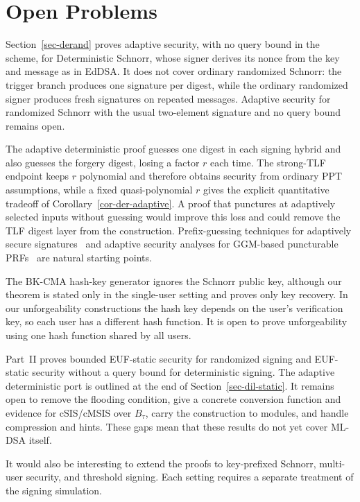 \section{Open Problems} \label{sec-conclusion}

 Section~\ref{sec-derand} proves adaptive security, with no query bound in the scheme, for Deterministic Schnorr, whose signer derives its nonce from the key and message as in EdDSA. It does not cover ordinary randomized Schnorr: the trigger branch produces one signature per digest, while the ordinary randomized signer produces fresh signatures on repeated messages. Adaptive security for randomized Schnorr with the usual two-element signature and no query bound remains open.

 The adaptive deterministic proof guesses one digest in each signing hybrid and also guesses the forgery digest, losing a factor $r$ each time. The strong-TLF endpoint keeps $r$ polynomial and therefore obtains security from ordinary PPT assumptions, while a fixed quasi-polynomial $r$ gives the explicit quantitative tradeoff of Corollary~\ref{cor-der-adaptive}. A proof that punctures at adaptively selected inputs without guessing would improve this loss and could remove the TLF digest layer from the construction. Prefix-guessing techniques for adaptively secure signatures~\cite{CCS:RamWat14} and adaptive security analyses for GGM-based puncturable PRFs~\cite{AC:FKPR14,C:JKKKPW17} are natural starting points.

 The BK-CMA hash-key generator ignores the Schnorr public key, although our theorem is stated only in the single-user setting and proves only key recovery. In our unforgeability constructions the hash key depends on the user's verification key, so each user has a different hash function. It is open to prove unforgeability using one hash function shared by all users.

 Part~II proves bounded EUF-static security for randomized signing and EUF-static security without a query bound for deterministic signing. The adaptive deterministic port is outlined at the end of Section~\ref{sec-dil-static}. It remains open to remove the flooding condition, give a concrete conversion function and evidence for cSIS/cMSIS over $B_\tau$, carry the construction to modules, and handle compression and hints. These gaps mean that these results do not yet cover ML-DSA itself.

 It would also be interesting to extend the proofs to key-prefixed Schnorr, multi-user security, and threshold signing. Each setting requires a separate treatment of the signing simulation.
